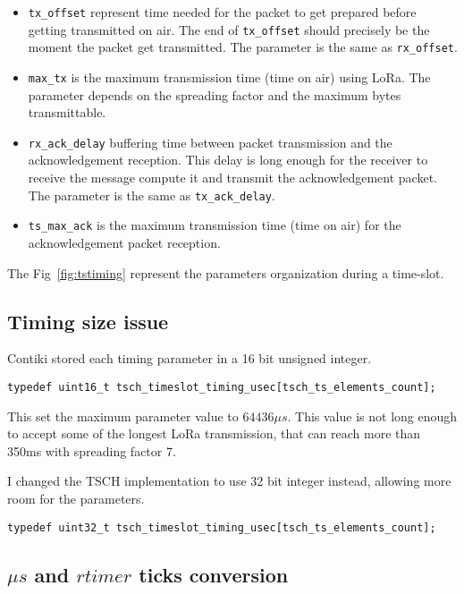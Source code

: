 \begin{itemize}
  \item \lstinline{tx_offset} represent time needed for the packet to get
    prepared before getting transmitted on air. The end of
    \lstinline{tx_offset} should precisely be the moment the packet get
    transmitted. The parameter is the same as \lstinline{rx_offset}.
  \item \lstinline{max_tx} is the maximum transmission time (time on air) using
    LoRa. The parameter depends on the spreading factor and the maximum bytes
    transmittable.
  \item \lstinline{rx_ack_delay} buffering time between packet transmission and
    the acknowledgement reception. This delay is long enough for the receiver
    to receive the message compute it and transmit the acknowledgement packet.
    The parameter is the same as \lstinline{tx_ack_delay}.
  \item \lstinline{ts_max_ack} is the maximum transmission time (time on air) for
    the acknowledgement packet reception.
\end{itemize}

The Fig~\ref{fig:tstiming} represent the parameters organization during
a time-slot.



\subsection{Timing size issue}

Contiki stored each timing parameter in a 16 bit unsigned integer.

\begin{lstlisting}
typedef uint16_t tsch_timeslot_timing_usec[tsch_ts_elements_count];
\end{lstlisting}

This set the maximum parameter value to $64436\mu s$.
This value is not long enough to accept some of the longest LoRa transmission, 
that can reach more than 350ms with spreading factor 7.

I changed the TSCH implementation to use 32 bit integer instead, allowing more
room for the parameters.

\begin{lstlisting}
typedef uint32_t tsch_timeslot_timing_usec[tsch_ts_elements_count];
\end{lstlisting}

\subsection{$\mu s$ and $rtimer$ ticks conversion}

